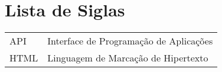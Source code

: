 \section*{Lista de Siglas}
\begin{tabular}{ll}
API & Interface de Programação de Aplicações \\
HTML & Linguagem de Marcação de Hipertexto \\
\end{tabular} 